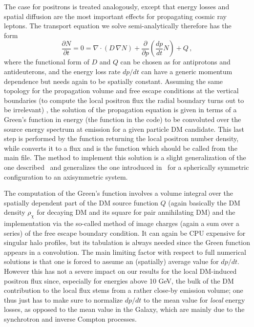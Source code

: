 The case for positrons is treated analogously, except that energy losses and spatial diffusion are
the most important effects for propagating cosmic ray leptons. The transport equation we solve 
semi-analytically therefore has the form~\cite{Baltz:1998xv}
\begin{equation}
 \frac{\partial{N}}{\partial{t}} = 0 = \nabla \cdot
 \left(D\,\nabla N\right)
 + \frac{\partial}{\partial{p}} \left( \frac{dp}{dt} N \right) + Q\,,
\label{eq:eplusdiff}
\end{equation}
where the functional form of $D$ and $Q$ can be chosen as for antiprotons and antideuterons, 
and the energy loss rate $dp/dt$ can have a generic
momentum dependence but needs again to be spatially constant. Assuming the same topology for
the propagation volume and free escape conditions at the vertical boundaries (to compute the local positron flux the radial boundary turns out to be irrelevant) ,
the solution of the propagation equation is given in terms of
a Green's function in energy (the function   in the code) to be convoluted over the
source energy spectrum at emission for a given particle DM candidate. This last step is performed
by the function  returning the local positron number density,
while  converts it to a flux and is the function which should be called from the main file.
The method to implement this solution is a slight generalization of the one described~\cite{Baltz:1998xv} and
generalizes the one introduced in~\cite{Colafrancesco:2005ji}
for a spherically symmetric configuration to an axisymmetric system.

The computation of the Green's function involves a volume integral over the spatially dependent part of
the DM source function $Q$ (again basically the DM density $\rho_\chi$ for decaying DM and its square for pair
 annihilating DM) 
and   the implementation via the so-called method of image charges (again a sum over a series)
of the free escape boundary condition. 
It can again be CPU expensive for singular halo profiles, but its
tabulation is always needed since the Green function appears in a convolution. The main limiting factor with
respect to full numerical solutions is that one is forced to assume an (spatially) average value for $dp/dt$. 
However this has not a severe
impact on our results for the local DM-induced positron flux since, especially for energies above 10 GeV, 
the bulk of the DM contribution to the local flux stems from a rather
close-by emission volume; one thus just has to make sure to normalize $dp/dt$ to the mean value for 
{\it local} energy losses, as opposed to the mean value in the Galaxy, which are mainly due to the 
synchrotron and inverse Compton processes.

